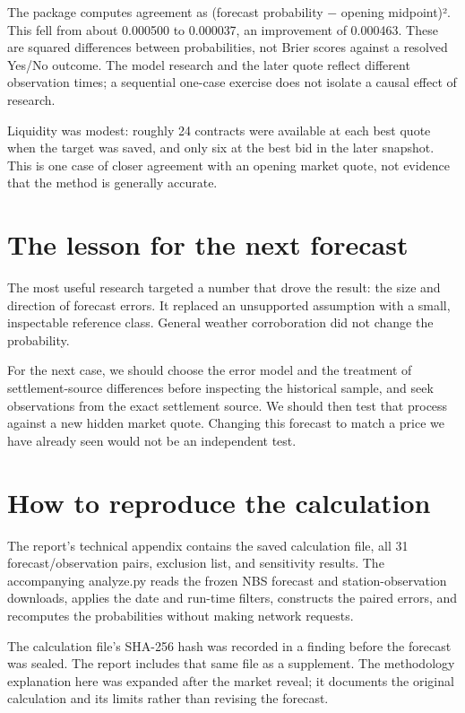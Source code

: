 \documentclass[11pt]{article}
\begin{document}
The package computes agreement as (forecast probability − opening midpoint)². This fell from about 0.000500 to 0.000037, an improvement of 0.000463. These are squared differences between probabilities, not Brier scores against a resolved Yes/No outcome. The model research and the later quote reflect different observation times; a sequential one-case exercise does not isolate a causal effect of research.


Liquidity was modest: roughly 24 contracts were available at each best quote when the target was saved, and only six at the best bid in the later snapshot. This is one case of closer agreement with an opening market quote, not evidence that the method is generally accurate.


\section*{\textcolor{epdarkgreen}{The lesson for the next forecast}}
The most useful research targeted a number that drove the result: the size and direction of forecast errors. It replaced an unsupported assumption with a small, inspectable reference class. General weather corroboration did not change the probability.


For the next case, we should choose the error model and the treatment of settlement-source differences before inspecting the historical sample, and seek observations from the exact settlement source. We should then test that process against a new hidden market quote. Changing this forecast to match a price we have already seen would not be an independent test.


\section*{\textcolor{epdarkgreen}{How to reproduce the calculation}}
The report’s technical appendix contains the saved calculation file, all 31 forecast/observation pairs, exclusion list, and sensitivity results. The accompanying analyze.py reads the frozen NBS forecast and station-observation downloads, applies the date and run-time filters, constructs the paired errors, and recomputes the probabilities without making network requests.


The calculation file’s SHA-256 hash was recorded in a finding before the forecast was sealed. The report includes that same file as a supplement. The methodology explanation here was expanded after the market reveal; it documents the original calculation and its limits rather than revising the forecast.
\end{document}
